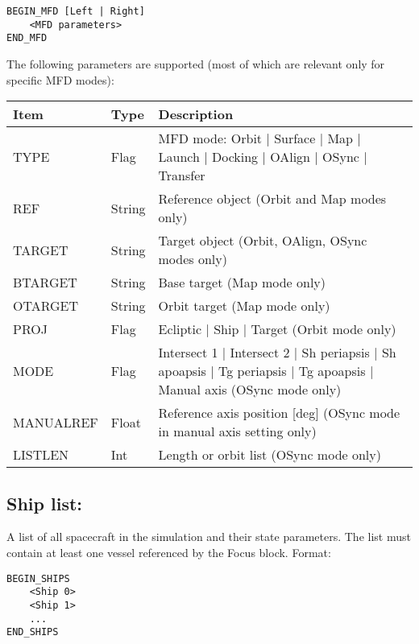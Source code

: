 \documentclass[Orbiter Developer Manual.tex]{subfiles}
\begin{document}
\begin{lstlisting}[language=OSFS]
BEGIN_MFD [Left | Right]
	<MFD parameters>
END_MFD
\end{lstlisting}

\noindent
The following parameters are supported (most of which are relevant only for specific MFD modes):

\begin{table}[H]
	\centering
	\begin{tabularx}{\textwidth}{ |l|l|X| }
	\hline\rule{0pt}{2ex}
	\textbf{Item} & \textbf{Type} & \textbf{Description}\\
	\hline\rule{0pt}{2ex}
	TYPE & Flag & MFD mode: Orbit | Surface | Map | Launch | Docking | OAlign | OSync | Transfer\\
	\hline\rule{0pt}{2ex}
	REF & String & Reference object (Orbit and Map modes only)\\
	\hline\rule{0pt}{2ex}
	TARGET & String & Target object (Orbit, OAlign, OSync modes only)\\
	\hline\rule{0pt}{2ex}
	BTARGET & String & Base target (Map mode only)\\
	\hline\rule{0pt}{2ex}
	OTARGET & String & Orbit target (Map mode only)\\
	\hline\rule{0pt}{2ex}
	PROJ & Flag & Ecliptic | Ship | Target (Orbit mode only)\\
	\hline\rule{0pt}{2ex}
	MODE & Flag & Intersect 1 | Intersect 2 | Sh periapsis | Sh apoapsis | Tg periapsis | Tg apoapsis | Manual axis (OSync mode only)\\
	\hline\rule{0pt}{2ex}
	MANUALREF & Float & Reference axis position [deg] (OSync mode in manual axis setting only)\\
	\hline\rule{0pt}{2ex}
	LISTLEN & Int & Length or orbit list (OSync mode only)\\
	\hline
	\end{tabularx}
\end{table}

\subsection*{Ship list:}
A list of all spacecraft in the simulation and their state parameters. The list must contain at least one vessel referenced by the Focus block. Format:

\begin{lstlisting}[language=OSFS]
BEGIN_SHIPS
	<Ship 0>
	<Ship 1>
	...
END_SHIPS
\end{lstlisting}
\end{document}
